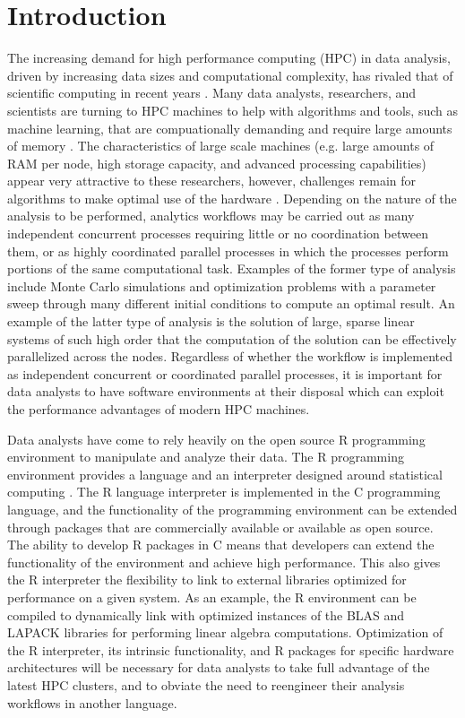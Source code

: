 \graphicspath{{plots/}}
\section{Introduction}

The increasing demand for high performance computing (HPC) in data analysis, driven by
increasing data sizes and computational complexity, has rivaled that of scientific
computing in recent years \cite{fox:bdBenchmarking, kouzes:paradigm}. Many data analysts,
researchers, and scientists are turning to HPC machines to help with algorithms and tools,
such as machine learning, that are compuationally demanding and require large amounts of
memory \cite{raj:hpcBigData}. The characteristics of large scale machines (e.g. large
amounts of RAM per node, high storage capacity, and advanced processing capabilities)
appear very attractive to these researchers, however, challenges remain for algorithms to
make optimal use of the hardware \cite{lee:model}. Depending on the nature of the analysis
to be performed, analytics workflows may be carried out as many independent concurrent
processes requiring little or no coordination between them, or as highly coordinated
parallel processes in which the processes perform portions of the same computational task.
Examples of the former type of analysis include Monte Carlo simulations and optimization
problems with a parameter sweep through many different initial conditions to compute an
optimal result.  An example of the latter type of analysis is the solution of large,
sparse linear systems of such high order that the computation of the solution can be
effectively parallelized across the nodes. Regardless of whether the workflow is
implemented as independent concurrent or coordinated parallel processes, it is important
for data analysts to have software environments at their disposal which can exploit the
performance advantages of modern HPC machines.

Data analysts have come to rely heavily on the open source R programming environment to
manipulate and analyze their data. The R programming environment provides a language and
an interpreter designed around statistical computing \cite{ihaka:R}. The R language
interpreter is implemented in the C programming language, and the functionality of the
programming environment can be extended through packages that are commercially available
or available as open source. The ability to develop R packages in C means that developers
can extend the functionality of the environment and achieve high performance. This also
gives the R interpreter the flexibility to link to external libraries optimized for
performance on a given system. As an example, the R environment can be compiled to
dynamically link with optimized instances of the BLAS \cite{dongarra:1990blas} and LAPACK
\cite{hammarling:1988blas} libraries for performing linear algebra computations.
Optimization of the R interpreter, its intrinsic functionality, and R packages for
specific hardware architectures will be necessary for data analysts to take full advantage
of the latest HPC clusters, and to obviate the need to reengineer their analysis workflows
in another language.

